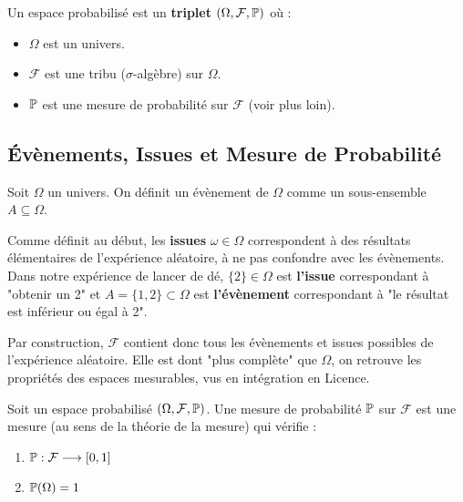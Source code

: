 \begin{definition}
    Un espace probabilisé est un \textbf{triplet} $ (\Omega, \mathcal{F}, \mathbb{P})$ où :
    \begin{itemize}
        \item $\Omega$ est un univers. 
        \item $ \mathcal{F}$ est une tribu ($\sigma$-algèbre) sur $ \Omega$. 
        \item $ \mathbb{P}$ est une mesure de probabilité sur $ \mathcal{F}$ (voir plus loin). 
    \end{itemize}
\end{definition}



\subsection{Évènements, Issues et Mesure de Probabilité }

\begin{definition}[Évènement]
    Soit $\Omega$ un univers. On définit un évènement de $\Omega$ comme un sous-ensemble $A \subseteq \Omega$. 
\end{definition}

\begin{remark}
    Comme définit au début, les \textbf{issues} $ \omega \in \Omega$ correspondent à des résultats élémentaires de l'expérience 
    aléatoire, à ne pas confondre avec les évènements. 
    Dans notre expérience de lancer de dé, $\{2\} \in \Omega$ est \textbf{l'issue} correspondant à "obtenir un 2" et 
    $A = \{1,2\} \subset \Omega$ est \textbf{l'évènement} correspondant à "le résultat est inférieur ou égal à 2". 
\end{remark}

Par construction, $ \mathcal{F}$ contient donc tous les évènements et issues possibles de l'expérience aléatoire. 
Elle est dont "plus complète" que $\Omega$, on retrouve les propriétés des espaces mesurables, vus en intégration en Licence. 

\begin{definition}
    Soit un espace probabilisé $(\Omega, \mathcal{F}, \mathbb{P})$. Une mesure de probabilité $ \mathbb{P}$ 
    sur $ \mathcal{F}$ est une mesure (au sens de la théorie de la mesure) qui vérifie : 
    \begin{enumerate}
        \item $ \mathbb{P} : \mathcal{F} \longrightarrow [0,1]$
        \item $ \mathbb{P}(\Omega) = 1$ 
    \end{enumerate}
\end{definition}

